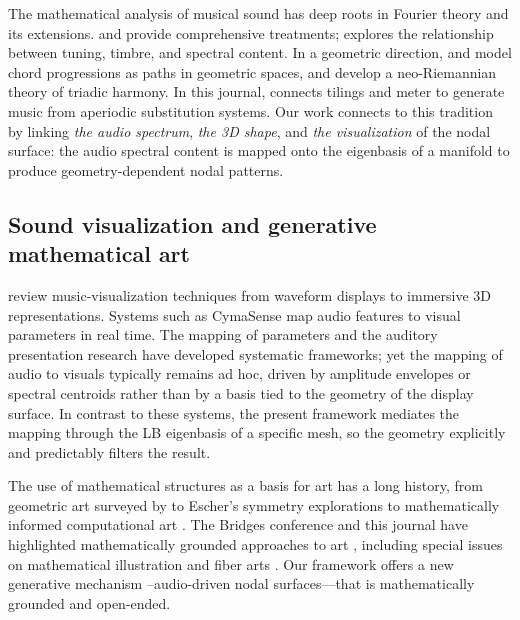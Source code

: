 \documentclass[]{interact}
\theoremstyle{plain}
\theoremstyle{definition}
\theoremstyle{remark}
\begin{document}
The mathematical analysis of musical sound has deep roots in Fourier theory and its extensions. \citet{benson2006} and \citet{loy2007} provide comprehensive treatments; \citet{sethares1998} explores the relationship between tuning, timbre, and spectral content. In a geometric direction, \citet{tymoczko2006} and \citet{callender2008} model chord progressions as paths in geometric spaces, and \citet{cohn2012} develop a neo-Riemannian theory of triadic harmony. In this journal, \citet{trevio2022} connects tilings and meter to generate music from aperiodic substitution systems. Our work connects to this tradition by linking \emph{the audio spectrum}, \emph{the 3D shape}, and \emph{the visualization} of the nodal surface: the audio spectral content is mapped onto the eigenbasis of a manifold to produce geometry-dependent nodal patterns.

\subsection{Sound visualization and generative mathematical art}

\citet{lima2022} review music-visualization techniques from waveform displays to immersive 3D representations. Systems such as CymaSense \citep{mcgowan2017} map audio features to visual parameters in real time. The mapping of parameters \citep{grond2011parameter,hermann2011sonification} and the auditory presentation research have developed systematic frameworks; yet the mapping of audio to visuals typically remains ad hoc, driven by amplitude envelopes or spectral centroids rather than by a basis tied to the geometry of the display surface. In contrast to these systems, the present framework mediates the mapping through the LB eigenbasis of a specific mesh, so the geometry explicitly and predictably filters the result.

The use of mathematical structures as a basis for art has a long history, from geometric art surveyed by \citet{ghyka1946} to Escher's symmetry explorations \citep{schattschneider2010mathematical} to mathematically informed computational art \citep{feijs2019}. The Bridges conference and this journal have highlighted mathematically grounded approaches to art \citep{harriss2022,goldstine2017}, including special issues on mathematical illustration and fiber arts \citep{belcastro2023}. Our framework offers a new generative mechanism --audio-driven nodal surfaces---that is mathematically grounded and open-ended.

\end{document}

